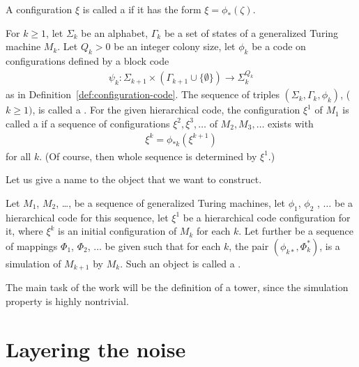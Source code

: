 \documentclass[12pt]{memoir}
\begin{document}
 \begin{definition}\label{def:code-config}
   A configuration \( \xi \) is called a  if 
it has the form \( \xi=\phi_{*}(\zeta) \).
 \end{definition}


\begin{definition}\label{def:hierarchical-code}
For \( k\ge 1 \), let \( \Sigma_k \) be an alphabet, \( \Gamma_k \) be
a set of states of a generalized Turing machine \( M_k \).
Let \( Q_k>0 \) be an integer colony size, let \( \phi_k \)
be a code on configurations defined by a block code
  \begin{align*}
       \psi_k: \Sigma_{k+1}\times(\Gamma_{k+1}\cup\{\emptyset\})
       \rightarrow \Sigma_k^{Q_k}
  \end{align*}
as in Definition~\ref{def:configuration-code}.
The sequence of triples \( (\Sigma_k,\Gamma_k,  \phi_k) \), (\( k\ge 1) \),  is
called a .
For the given hierarchical code, the configuration \( \xi^{1} \) of \( M_{1} \)
is called a  if a sequence
of configurations \( \xi^{2},\xi^{3},\dots \) of \( M_{2},M_{3},\dots \) exists with
\begin{align*}
 \xi^{k}=\phi_{*k}(\xi^{k+1})
 \end{align*} 
for all \( k \).
(Of course, then whole sequence is determined by \( \xi^{1} \).)
\end{definition}

Let us give a name to the object that we want to construct.

\begin{definition}[A tower]\label{def:tower}
Let \( M_1 \), \( M_2 \), \dots, be a sequence of generalized Turing machines,
let \( \phi_{1} \), \( \phi_{2} \) , \(\dots \) be a hierarchical code for this sequence,
let \( \xi^{1} \) be a hierarchical code configuration for it, where \( \xi^{k} \) is an
initial configuration of \( M_{k} \) for each \( k \).
Let further be a sequence of mappings \( \Phi_{1} \), \( \Phi_{2} \), \( \dots \) be
given such that for each \( k \), the pair \( (\phi_{k*},\Phi_{k}^{*}) \),
is a simulation of \( M_{k+1} \) by \( M_{k} \).
Such an object is called a .
\end{definition}

The main task of the work will be the definition of a tower, since the simulation
property is highly nontrivial.


\section{Layering the noise}\label{sec:noise}
\end{document}
